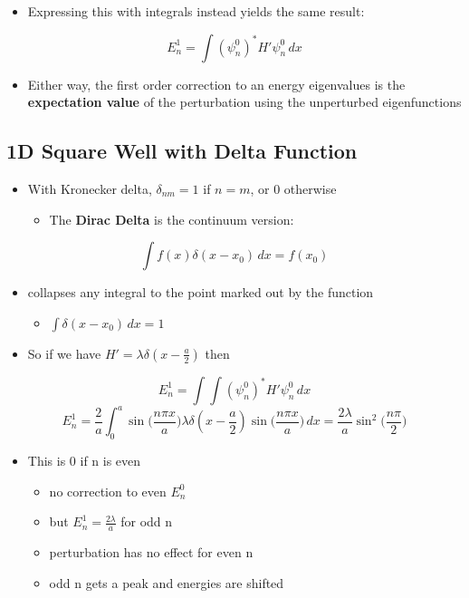 \documentclass[a4paper,11pt,normalem]{article}
\begin{document}
\begin{itemize}
\item
  Expressing this with integrals instead yields the same result:
\end{itemize}

\[
    E_{n}^1 = \int (\psi_{n}^0)^* H' \psi_{n}^0 \,dx
\]

\begin{itemize}
\item
  Either way, the first order correction to an energy eigenvalues is the
  \textbf{expectation value} of the perturbation using the unperturbed
  eigenfunctions
\end{itemize}

\subsection{1D Square Well with Delta Function}\label{d-square-well-with-delta-function}

\begin{itemize}
\item
  With Kronecker delta, \(\delta_{nm} = 1\) if \(n = m\), or 0 otherwise
  \begin{itemize}
  \item
    The \textbf{Dirac Delta} is the continuum version:
  \end{itemize}
\end{itemize}

\[
    \int f(x)\delta(x - x_0) \,dx = f(x_0)
\]

\begin{itemize}
\item
  collapses any integral to the point marked out by the function
  \begin{itemize}
  \item
    \(\int \delta(x - x_0)\,dx = 1\)
  \end{itemize}
\item
  So if we have \(H' = \lambda\delta(x - \frac{a}{2})\) then
\end{itemize}

\[
    E_{n}^1 = \int \int (\psi_{n}^0)^* H' \psi_{n}^0 \,dx \] \[
    E_{n}^1 = \frac{2}{a}\int_{0}^{a} \sin\Big(\frac{n\pi x}{a}\Big)\lambda\delta(x - \frac{a}{2})\sin\Big(\frac{n\pi x}{a}\Big)\,dx = \frac{2\lambda}{a}\sin^2 \Big(\frac{n\pi}{2}\Big)
\]

\begin{itemize}
\item
  This is 0 if n is even
  \begin{itemize}
  \item
    no correction to even \(E_{n}^0\)
  \item
    but \(E_{n}^1 = \frac{2\lambda}{a}\) for odd n
  \item
    perturbation has no effect for even n
  \item
    odd n gets a peak and energies are shifted
  \end{itemize}
\end{itemize}
\end{document}
